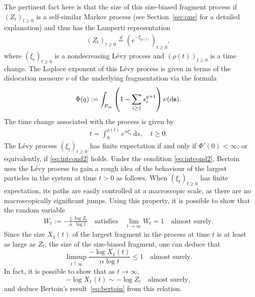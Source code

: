 \documentclass[a4,12pt]{amsart}
\numberwithin{equation}{section}
\newcommand{\MassP}{\mathcal{P}_{\rm m}}
\begin{document}
	The pertinent fact here is that the size of this size-biased fragment process
    if $(Z_t)_{t \geq 0}$ is a self-similar Markov process
	(see Section~\ref{sec:one} for a detailed explanation) and thus has the Lamperti representation
	\begin{align} \label{eq:distid}
	    (Z_t)_{t \geq 0} \overset{d}{=} \left( e^{- \xi_{\rho(t)}} \right)_{t \geq 0},
	\end{align}
	where $(\xi_t)_{t \geq 0}$ is a nondecreasing L\'evy process and $(\rho(t))_{t \geq 0}$ is a time change.
    The Laplace exponent of this L\'evy process is given in terms of the dislocation measure $\nu$ of the underlying fragmentation via the formula
        \begin{align*}
        \Phi(q) := \int_{\MassP} \left( 1 - \sum_{i \geq 1} s_i^{q+1} \right) \nu (\mathrm{d}\mathbf{s}).
    \end{align*}
    The time change associated with the process is given by
   	\begin{align} \label{eq:sclock}
		t = \int_0^{\rho(t)} e^{\alpha \xi_s} \, \mathrm{d}s, \quad t \geq 0.
	\end{align} 
    The L\'evy process $(\xi_t)_{t \geq 0}$ has finite expectation if and only if $\Phi'(0) <\infty$, or equivalently, if \eqref{eq:intcond2} holds. Under the condition \eqref{eq:intcond2}, Bertoin uses the L\'evy process to gain a rough idea of the behaviour of the largest particles in the system at time $t > 0$ as follows. 
	When $(\xi_t)_{t \geq 0}$ has finite expectation, its paths are easily controlled at a macroscopic scale,
	as there are no macroscopically significant jumps.
	Using this property, it is possible to show that the random variable
	\begin{align*} 
    		W_t := -\frac{1}{\alpha} \frac{\log Z_t}{\log t} 
    		\quad \text{satisfies} \quad \lim_{t \to \infty} W_t = 1 \quad \text{almost surely}.
	\end{align*}
	Since the size $X_1(t)$ of the largest fragment in the process at time $t$ is at least as large as $Z_t$,
	the size of the size-biased fragment, one can deduce that
	\begin{equation}\label{eq:x1limsup}
    		\limsup_{t \uparrow \infty} \frac{-\log X_1(t)}{\alpha \log t} \leq 1 \quad \text{almost surely}.
	\end{equation}
	In fact, it is possible to show that as $t \to \infty$, 
	\[
    		-\log X_1(t) \sim -\log Z_t \quad \text{almost surely},
	\]
	and deduce Bertoin’s result~\eqref{eq:bertoin} from this relation.
\end{document}
